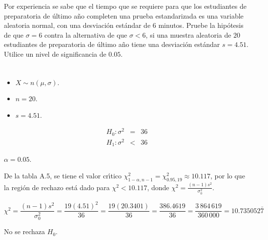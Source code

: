 \begin{enunciado}
 Por experiencia se sabe
 que el tiempo que se requiere para que los estudiantes de preparatoria
 de \'ultimo a\~no completen una prueba estandarizada es una variable aleatoria
 normal, con una desviaci\'on est\'andar de $6$ minutos.
 Pruebe la hip\'otesis de que $\sigma = 6$ contra la alternativa
 de que $\sigma < 6$,
 si una muestra aleatoria de $20$ estudiantes de preparatoria de \'ultimo a\~no
 tiene una desviaci\'on est\'andar $s = 4.51$.
 Utilice un nivel de significancia de $0.05$.
\end{enunciado}

\begin{solucion}
 \begin{datos}
  $\phantom{0}$
  \begin{itemize}
   \item $X \sim n\left( \mu, \sigma \right)$.
   \item $n = 20$.
   \item $s = 4.51$.
  \end{itemize}
 \end{datos}

 \begin{hipotesis}
  \begin{eqnarray*}
   H_0: \sigma^2 & = & 36 \\
   H_1: \sigma^2 & < & 36
  \end{eqnarray*}
 \end{hipotesis}

 \begin{significancia}
  $\alpha = 0.05$.
 \end{significancia}

 \begin{region}
  De la tabla A.5, se tiene el valor cr\'{\i}tico
  $\chi^2_{1-\alpha,n-1}=\chi^2_{0.95,19} \approx 10.117$,
  por lo que la regi\'on de rechazo est\'a dado para $\chi^2 < 10.117$,
  donde $\chi^2 = \frac{(n-1)s^2}{\sigma_0^2}$.
 \end{region}

 \begin{estadistico}
  \begin{equation*}
   \chi^2 = \frac{(n-1)s^2}{\sigma_0^2} = \frac{19(4.51)^2}{36}
   = \frac{19(20.3401)}{36} = \frac{386.4619}{36}
   = \frac{3\,864\,619}{360\,000} = 10.735052\bar{7}
  \end{equation*}
 \end{estadistico}

 \begin{decision}
  No se rechaza $H_0$.
 \end{decision}


\end{solucion}
